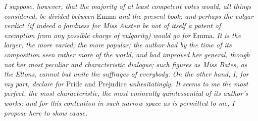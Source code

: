 \documentclass[12pt,openright]{book}
\begin{document}
\textit{I suppose, however, that the majority of at least competent votes}\textit{ }\textit{would, all things considered, be divided between} Emma \textit{and the present}\textit{ }\textit{book; and perhaps the vulgar verdict (if indeed a fondness for Miss}\textit{ }\textit{Austen be not of itself a patent of exemption from any possible charge}\textit{ }\textit{of vulgarity) would go for} Emma. \textit{It is the larger, the more varied, the}\textit{ }\textit{more popular; the author had by the time of its composition seen rather}\textit{ }\textit{more of the world, and had improved her general, though not her most}\textit{ }\textit{peculiar and characteristic dialogue; such figures as Miss Bates, as the}\textit{ }\textit{Eltons, cannot but unite the suffrages of everybody. On the other hand,}\textit{ }\textit{I, for my part, declare for} Pride and Prejudice \textit{unhesitatingly. It}\textit{ }\textit{seems to me the most perfect, the most characteristic, the most}\textit{ }\textit{eminently quintessential of its author’s works; and for this contention}\textit{ }\textit{in such narrow space as is permitted to me, I propose here to show}\textit{ }\textit{cause.}
\end{document}
